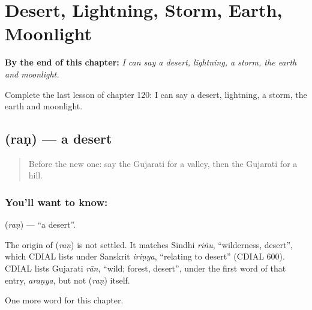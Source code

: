 
\chapter{Desert, Lightning, Storm, Earth, Moonlight}
\label{ch:gu-desert-lightning-storm-earth-moonlight}

\begin{chapteropening}
\textbf{By the end of this chapter:} \emph{I can say a desert, lightning, a storm, the earth and moonlight.}

Complete the last lesson of chapter 120: I can say a desert, lightning, a storm, the earth and moonlight.
\end{chapteropening}

\section[\texorpdfstring{\gu{રણ} (raṇ)}{રણ (raṇ)}]{ (raṇ) — a desert}

\label{lesson:GU-C120-ran}



\begin{quote}
Before the new one: say the Gujarati for a valley, then the Gujarati for a hill.
\end{quote}

\subsection*{You'll want to know: }
\textbf{} (\emph{raṇ}) — \textquotedblleft{}a desert\textquotedblright{}.

\begin{cousinweb}
The origin of \textbf{} (\emph{raṇ}) is not settled. It matches Sindhi \emph{riñu}, \textquotedblleft{}wilderness, desert\textquotedblright{}, which CDIAL lists under Sanskrit \emph{iriṇya}, \textquotedblleft{}relating to desert\textquotedblright{} (CDIAL 600). CDIAL lists Gujarati \emph{rān}, \textquotedblleft{}wild; forest, desert\textquotedblright{}, under the first word of that entry, \emph{araṇya}, but not \textbf{} (\emph{raṇ}) itself.
\end{cousinweb}

\begin{grammarlens}[title={What you've built}]
One more word for this chapter.
\end{grammarlens}

